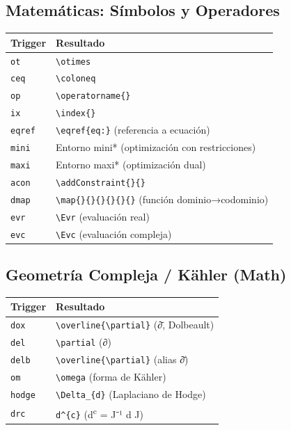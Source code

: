 \documentclass[11pt]{article}
\begin{document}
\subsection{Matemáticas: Símbolos y Operadores}
\label{sec:org284af16}
\begin{center}
\begin{tabular}{ll}
Trigger & Resultado\\
\hline
\texttt{ot} & \texttt{\textbackslash{}otimes}\\
\texttt{ceq} & \texttt{\textbackslash{}coloneq}\\
\texttt{op} & \texttt{\textbackslash{}operatorname\{\}}\\
\texttt{ix} & \texttt{\textbackslash{}index\{\}}\\
\texttt{eqref} & \texttt{\textbackslash{}eqref\{eq:\}} (referencia a ecuación)\\
\texttt{mini} & Entorno mini* (optimización con restricciones)\\
\texttt{maxi} & Entorno maxi* (optimización dual)\\
\texttt{acon} & \texttt{\textbackslash{}addConstraint\{\}\{\}}\\
\texttt{dmap} & \texttt{\textbackslash{}map\{\}\{\}\{\}\{\}\{\}\{\}} (función dominio→codominio)\\
\texttt{evr} & \texttt{\textbackslash{}Evr} (evaluación real)\\
\texttt{evc} & \texttt{\textbackslash{}Evc} (evaluación compleja)\\
\end{tabular}
\end{center}
\subsection{Geometría Compleja / Kähler (Math)}
\label{sec:org740344b}
\begin{center}
\begin{tabular}{ll}
Trigger & Resultado\\
\hline
\texttt{dox} & \texttt{\textbackslash{}overline\{\textbackslash{}partial\}} (∂̄, Dolbeault)\\
\texttt{del} & \texttt{\textbackslash{}partial} (∂)\\
\texttt{delb} & \texttt{\textbackslash{}overline\{\textbackslash{}partial\}} (alias ∂̄)\\
\texttt{om} & \texttt{\textbackslash{}omega} (forma de Kähler)\\
\texttt{hodge} & \texttt{\textbackslash{}Delta\_\{d\}} (Laplaciano de Hodge)\\
\texttt{drc} & \texttt{d\textasciicircum{}\{c\}} (d\textsuperscript{c} = J⁻¹ d J)\\
\end{tabular}
\end{center}
\end{document}
